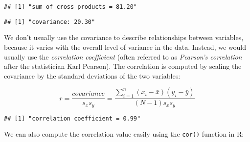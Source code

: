 \documentclass[]{book}
\newenvironment{Shaded}{\begin{snugshade}}{\end{snugshade}}
\newcommand{\KeywordTok}[1]{\textcolor[rgb]{0.13,0.29,0.53}{\textbf{#1}}}
\newcommand{\DecValTok}[1]{\textcolor[rgb]{0.00,0.00,0.81}{#1}}
\newcommand{\StringTok}[1]{\textcolor[rgb]{0.31,0.60,0.02}{#1}}
\newcommand{\CommentTok}[1]{\textcolor[rgb]{0.56,0.35,0.01}{\textit{#1}}}
\newcommand{\OperatorTok}[1]{\textcolor[rgb]{0.81,0.36,0.00}{\textbf{#1}}}
\newcommand{\NormalTok}[1]{#1}
\theoremstyle{definition}
\theoremstyle{definition}
\theoremstyle{definition}
\theoremstyle{remark}
\begin{document}
\begin{verbatim}
## [1] "sum of cross products = 81.20"
\end{verbatim}

\begin{Shaded}
\end{Shaded}

\begin{verbatim}
## [1] "covariance: 20.30"
\end{verbatim}

We don't usually use the covariance to describe relationships between
variables, because it varies with the overall level of variance in the
data. Instead, we would usually use the \emph{correlation coefficient}
(often referred to as \emph{Pearson's correlation} after the
statistician Karl Pearson). The correlation is computed by scaling the
covariance by the standard deviations of the two variables:

\[
r = \frac{covariance}{s_xs_y} = \frac{\sum_{i=1}^n (x_i - \bar{x})(y_i - \bar{y})}{(N - 1)s_x s_y}
\]

\begin{Shaded}
\end{Shaded}

\begin{verbatim}
## [1] "correlation coefficient = 0.99"
\end{verbatim}

We can also compute the correlation value easily using the
\texttt{cor()} function in R:
\end{document}
